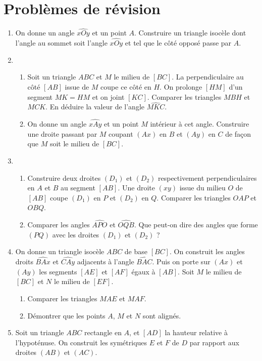 \documentclass[12 pt]{report}
\theoremstyle{plain}
\newcounter{n}
\begin{document}
\chapter*{Problèmes de révision } 
 \begin{enumerate}
 \item On donne un angle $\widehat{xOy}$ et un point $A$. Construire un triangle isocèle dont l'angle au sommet soit l'angle $\widehat{xOy}$ et tel que le côté opposé passe par $A$. 
 \item \begin{enumerate}
 \item Soit un triangle $ABC$ et $M$ le milieu de $[BC]$. La perpendiculaire au côté $[AB]$ issue de $M$ coupe ce côté en $H$. On prolonge $[HM]$ d'un segment $MK=HM$
 et on joint $[KC]$. Comparer les triangles $MBH$ et $MCK$. En déduire la valeur de l'angle $\widehat{MKC}$. 
 \item On donne un angle $\widehat{xAy}$ et un point $M$ intérieur à cet angle. Construire une droite passant par $M$ coupant $(Ax)$ en $B$ et $(Ay)$ en $C$ de façon que $M$ soit le milieu de $[BC]$. 
 \end{enumerate}
 \item \begin{enumerate}
 \item Construire deux droites $(D_1)$ et $(D_2)$ respectivement perpendiculaires
 en $A$ et $B$ au segment $[AB]$. Une droite $(xy)$ issue du milieu $O$ de $[AB]$ coupe $(D_1)$ en $P$ et $(D_2)$ en $Q$. Comparer les triangles $OAP$ et $OBQ$.
 \item Comparer les angles $\widehat{APO}$ et $\widehat{OQB}$. Que peut-on dire des angles que forme $(PQ)$ avec les droites $(D_1)$ et $(D_2)$ ?
 \end{enumerate}
 \item On donne un triangle isocèle $ABC$ de base $[BC]$. On construit les angles droits $\widehat{BAx}$ et $\widehat{CAy}$ adjacents à l'angle $\widehat{BAC}$. 
 Puis on porte sur $(Ax)$ et $(Ay)$ les segments $[AE]$ et $[AF]$ égaux à $[AB]$.
 Soit $M$ le milieu de $[BC]$ et $N$ le milieu de $[EF]$. \begin{enumerate}
 \item Comparer les triangles $MAE$ et $MAF$.
 \item Démontrer que les points $A$, $M$ et $N$ sont alignés.
 \end{enumerate}
 \item Soit un triangle $ABC$ rectangle en $A$, et $[AD]$ la hauteur relative à l'hypoténuse. On construit les symétriques $E$ et $F$ de $D$ par rapport aux droites $(AB)$ et $(AC)$.\begin{enumerate}

\end{enumerate}
\end{enumerate}
\end{document}
